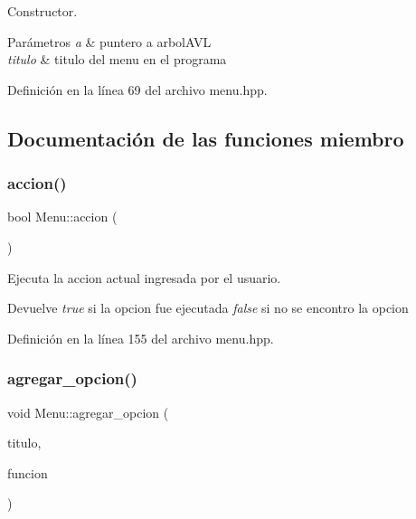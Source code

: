 Constructor. 


\begin{DoxyParams}{Parámetros}
{\em a} & puntero a arbol\+A\+VL \\
\hline
{\em titulo} & titulo del menu en el programa \\
\hline
\end{DoxyParams}


Definición en la línea 69 del archivo menu.\+hpp.



\subsection{Documentación de las funciones miembro}
\mbox{\label{classMenu_ab5609ebe5415d2e5f06143819b832981}} 
\subsubsection{\texorpdfstring{accion()}{accion()}}
{\footnotesize\ttfamily bool Menu\+::accion (\begin{DoxyParamCaption}{ }\end{DoxyParamCaption})\hspace{0.3cm}{\ttfamily [inline]}}



Ejecuta la accion actual ingresada por el usuario. 

\begin{DoxyReturn}{Devuelve}
{\itshape true} si la opcion fue ejecutada {\itshape false} si no se encontro la opcion 
\end{DoxyReturn}


Definición en la línea 155 del archivo menu.\+hpp.

\mbox{\label{classMenu_a1e1f674058f3fd03a500859abda7dded}} 
\subsubsection{\texorpdfstring{agregar\+\_\+opcion()}{agregar\_opcion()}}
{\footnotesize\ttfamily void Menu\+::agregar\+\_\+opcion (\begin{DoxyParamCaption}\item[{std\+::string}]{titulo,  }\item[{std\+::function$<$ bool(\hyperlink{classArbolAVL}{Arbol\+A\+VL} $\ast$a)$>$ $\ast$}]{funcion }\end{DoxyParamCaption})\hspace{0.3cm}{\ttfamily [inline]}}



